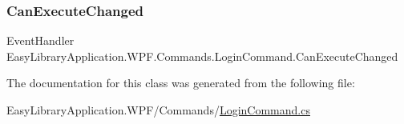\subsubsection{\texorpdfstring{Can\+Execute\+Changed}{CanExecuteChanged}}
{\footnotesize\ttfamily Event\+Handler Easy\+Library\+Application.\+W\+P\+F.\+Commands.\+Login\+Command.\+Can\+Execute\+Changed}



The documentation for this class was generated from the following file\+:\begin{DoxyCompactItemize}
\item 
Easy\+Library\+Application.\+W\+P\+F/\+Commands/\mbox{\hyperlink{_login_command_8cs}{Login\+Command.\+cs}}\end{DoxyCompactItemize}

